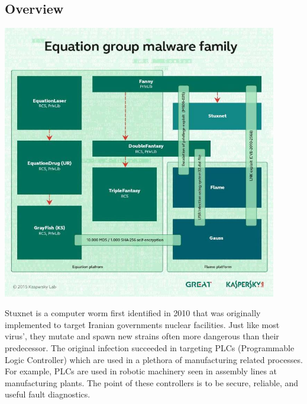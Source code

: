 \documentclass[12pt, letterpaper]{article}
\begin{document}
\begin{sloppypar}


\begin{flushleft}
\section{Overview}
\begin{center}
{\includegraphics[width=0.9\textwidth]{equation_group_family.jpg}}
\end{center}
Stuxnet is a computer worm first identified in 2010 that was originally implemented to target Iranian governments nuclear facilities. Just like 
most virus', they mutate and spawn new strains often more dangerous than
their predecessor. The original infection succeeded in targeting PLCs
(Programmable Logic Controller) which are used in a plethora of 
manufacturing related processes. For example, PLCs are used in robotic
machinery seen in assembly lines at manufacturing plants. The point of 
these controllers is to be secure, reliable, and useful fault diagnostics. 


\end{flushleft}
\end{sloppypar}
\end{document}
